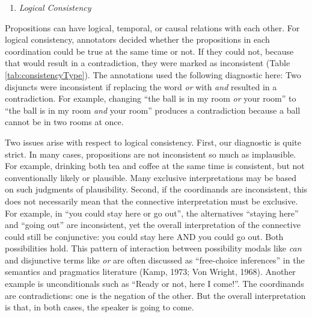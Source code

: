 \documentclass[
  ,man,floatsintext]{apa6}
\providecommand{\tightlist}{%
  \setlength{\itemsep}{0pt}\setlength{\parskip}{0pt}}
\begin{document}
\begin{enumerate}
\def\labelenumi{\arabic{enumi}.}
\setcounter{enumi}{1}
\tightlist
\item
  \emph{Logical Consistency}
\end{enumerate}

Propositions can have logical, temporal, or causal relations with each other. For logical consistency, annotators decided whether the propositions in each coordination could be true at the same time or not. If they could not, because that would result in a contradiction, they were marked as inconsistent (Table \ref{tab:consistencyType}). The annotations used the following diagnostic here: Two disjuncts were inconsistent if replacing the word \emph{or} with \emph{and} resulted in a contradiction. For example, changing ``the ball is in my room \emph{or} your room'' to ``the ball is in my room \emph{and} your room'' produces a contradiction because a ball cannot be in two rooms at once.

Two issues arise with respect to logical consistency. First, our diagnostic is quite strict. In many cases, propositions are not inconsistent so much as implausible. For example, drinking both tea and coffee at the same time is consistent, but not conventionally likely or plausible. Many exclusive interpretations may be based on such judgments of plausibility. Second, if the coordinands are inconsistent, this does not necessarily mean that the connective interpretation must be exclusive. For example, in ``you could stay here or go out'', the alternatives ``staying here'' and ``going out'' are inconsistent, yet the overall interpretation of the connective could still be conjunctive: you could stay here AND you could go out. Both possibilities hold. This pattern of interaction between possibility modals like \emph{can} and disjunctive terms like \emph{or} are often discussed as ``free-choice inferences'' in the semantics and pragmatics literature (Kamp, 1973; Von Wright, 1968). Another example is unconditionals such as ``Ready or not, here I come!''. The coordinands are contradictions: one is the negation of the other. But the overall interpretation is that, in both cases, the speaker is going to come.
\end{document}
